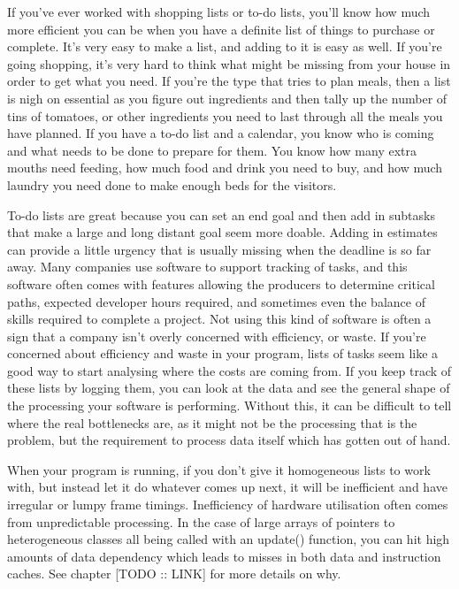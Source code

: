 \documentclass[a4paper,12pt]{book}
\begin{document}
If you've ever worked with shopping lists or to-do lists, you'll know how much more efficient you can be when you have a definite list of things to purchase or complete.
It's very easy to make a list, and adding to it is easy as well.
If you're going shopping, it's very hard to think what might be missing from your house in order to get what you need.
If you're the type that tries to plan meals, then a list is nigh on essential as you figure out ingredients and then tally up the number of tins of tomatoes, or other ingredients you need to last through all the meals you have planned.
If you have a to-do list and a calendar, you know who is coming and what needs to be done to prepare for them.
You know how many extra mouths need feeding, how much food and drink you need to buy, and how much laundry you need done to make enough beds for the visitors.

To-do lists are great because you can set an end goal and then add in subtasks that make a large and long distant goal seem more doable.
Adding in estimates can provide a little urgency that is usually missing when the deadline is so far away.
Many companies use software to support tracking of tasks, and this software often comes with features allowing the producers to determine critical paths, expected developer hours required, and sometimes even the balance of skills required to complete a project.
Not using this kind of software is often a sign that a company isn't overly concerned with efficiency, or waste.
If you're concerned about efficiency and waste in your program, lists of tasks seem like a good way to start analysing where the costs are coming from.
If you keep track of these lists by logging them, you can look at the data and see the general shape of the processing your software is performing.
Without this, it can be difficult to tell where the real bottlenecks are, as it might not be the processing that is the problem, but the requirement to process data itself which has gotten out of hand.

When your program is running, if you don't give it homogeneous lists to work with, but instead let it do whatever comes up next, it will be inefficient and have irregular or lumpy frame timings.
Inefficiency of hardware utilisation often comes from unpredictable processing.
In the case of large arrays of pointers to heterogeneous classes all being called with an update() function, you can hit high amounts of data dependency which leads to misses in both data and instruction caches.
See chapter [TODO :: LINK] for more details on why.
\end{document}
